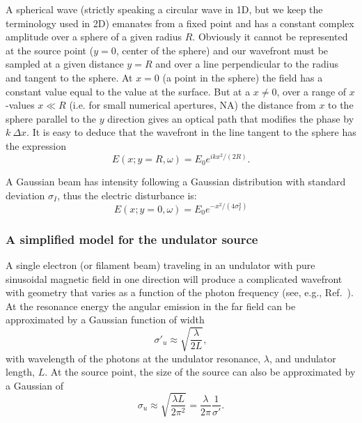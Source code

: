 \documentclass[preprint]{iucr}
\begin{document}
A spherical wave (strictly speaking a circular wave in 1D, but we keep the terminology used in 2D) emanates from a fixed point and has a constant complex amplitude over a sphere of a given radius $R$. Obviously it cannot be represented at the source point ($y=0$, center of the sphere) and our wavefront must be sampled at a given distance $y=R$ and over a line perpendicular to the radius and tangent to the sphere. At $x=0$ (a point in the sphere) the field has a constant value equal to the value at the surface. But at a $x{\ne}0$, over a range of $x$-values $x{\ll}R$ (i.e. for small numerical apertures, NA) the distance from $x$ to the sphere parallel to the $y$ direction gives an optical path that modifies the phase by $k ~\Delta x$. It is easy to deduce that the wavefront in the line tangent to the sphere has the expression
\begin{equation}
\label{eq:sphericalWave}
    E(x;y=R,\omega)  = E_0 e^{i k x^2 / (2 R)}.
\end{equation}


A Gaussian beam has intensity following a Gaussian distribution with standard deviation $\sigma_I$, thus the electric disturbance is: 
\begin{equation}
\label{eq:gaussianSource}
    E(x;y=0,\omega) = E_0 e^{-x^2 / (4 \sigma_I^2)}
\end{equation}


\subsubsection{A simplified model for the undulator source}
\label{sec:undulator}

A single electron (or filament beam) traveling in an undulator with pure sinusoidal magnetic field in one direction will produce a complicated wavefront with geometry that varies as a function of the photon frequency (see, e.g., Ref.~\cite{elleaume}). At the resonance energy the angular emission in the far field can be approximated by a Gaussian function of width \cite{elleaume}
\begin{equation}
\label{eq:undulatorDivergence}
    \sigma'_u \approx\sqrt{\frac{\lambda}{2 L}},
\end{equation}
with wavelength of the photons at the undulator resonance, $\lambda$, and undulator length, $L$. At the source point, the size of the source can also be approximated by a Gaussian of
\begin{equation}
\label{eq:undulatorSize}
    \sigma_u \approx\sqrt{\frac{\lambda L}{2 \pi^2}} = \frac{\lambda}{2 \pi} \frac{1}{\sigma'}.
\end{equation}
\end{document}
